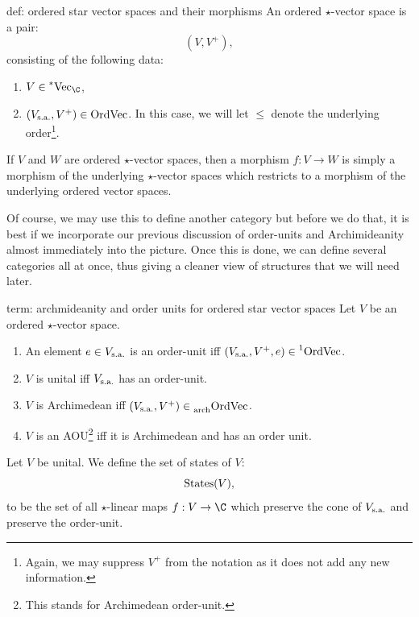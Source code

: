\documentclass[main.tex]{subfiles}
\begin{document}
\begin{definition}{}{def: ordered star vector spaces and their morphisms}
An ordered $\star$-vector space is a pair: 
\[(V,V^+),\]    
consisting of the following data: 
\begin{enumerate}
    \item $V \in \StarVect$,  
    \item $(V_{\text{s.a.}},V^+) \in \text{OrdVec}$. In this case, we will let $\leq$ denote the underlying order\footnote{Again, we may suppress $V^+$ from the notation as it does not add any new information.}.  
\end{enumerate}
If $V$ and $W$ are ordered $\star$-vector spaces, then a morphism $f: V \to W$ is simply a morphism of the underlying $\star$-vector spaces which restricts to a morphism of the underlying ordered vector spaces. 
\end{definition}

Of course, we may use this to define another category but before we do that, it is best if we incorporate our previous discussion of order-units and Archimideanity almost immediately into the picture. Once this is done, we can define several categories all at once, thus giving a cleaner view of structures that we will need later. 

\begin{terminology}{}{term: archmideanity and order units for ordered star vector spaces}
Let $V$ be an ordered $\star$-vector space. 
\begin{enumerate}
    \item An element $e \in V_{\text{s.a.}}$ is an order-unit iff $(V_{\text{s.a.}},V^+,e) \in \prescript{1}{}{\text{OrdVec}}$.   
    \item $V$ is unital iff $V_{\text{s.a.}}$ has an order-unit. 
    \item $V$ is Archimedean iff $(V_{\text{s.a.}},V^+) \in \prescript{}{\text{arch}}{\text{OrdVec}}$.  
    \item $V$ is an AOU\footnote{This stands for Archimedean order-unit.} iff it is Archimedean and has an order unit.  
\end{enumerate}
Let $V$ be unital. We define the set of states of $V$: 
\[\operatorname{States}(V),\]
to be the set of all $\star$-linear maps $f: V \to \C$ which preserve the cone of $V_{\text{s.a.}}$ and preserve the order-unit. 
\end{terminology}
\end{document}
